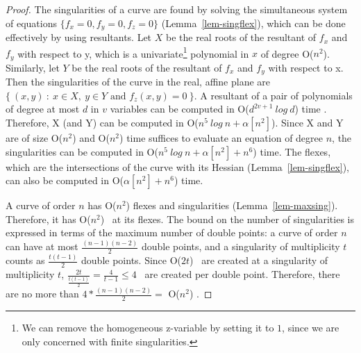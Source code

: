 \begin{proof}
The singularities of a curve are found by solving the simultaneous system
of equations
\mbox{$\{f_{x} = 0, f_{y}=0, f_{z} = 0\}$} (Lemma~\ref{lem-singflex}),
which can be done effectively by using resultants.
Let $X$ be the real roots of the resultant of $f_{x}$ and $f_{y}$ with 
respect to y,
which is a univariate\footnote{We can remove the
homogeneous z-variable by setting it to $1$, since we are only concerned
with finite singularities.}
polynomial in $x$ of degree O($n^{2}$).
Similarly, let $Y$ be the real roots of the resultant of $f_{x}$ and $f_{y}$ with 
respect to x.
Then the singularities of the curve in the real, affine plane are
\mbox{$\{\ (x,y)\ :\ x\in X,\ y \in Y \mbox{ and } f_{z}(x,y) = 0\ \}$.}
A resultant of a pair of polynomials of degree at most $d$ in $v$ variables 
can be computed in O($d^{2v+1}\ log\ d$) time \cite{col}.
Therefore, X (and Y) can be computed in O($n^{5}\ log\ n + \alpha[n^{2}]$).
Since X and Y are of size O($n^{2}$) and  
O($n^{2}$) time suffices 
to evaluate  an equation of degree $n$, the singularities
can be computed in O($n^{5}\ log\ n + \alpha[n^{2}] + n^{6}$) time.
The flexes, which are the intersections of the curve with its
Hessian (Lemma~\ref{lem-singflex}),
can also be computed in  O($\alpha[n^{2}] + n^{6}$) time.

A curve of order $n$ has O($n^{2}$) flexes and 
singularities (Lemma~\ref{lem-maxsing}).
Therefore, it has O($n^{2}$) \wallpoints\ at its flexes.
The bound on the number of singularities is expressed in terms
of the maximum number of double points: a curve of order $n$ can
have at most $\frac{(n-1)(n-2)}{2}$ double points, and
a singularity of multiplicity $t$ counts as $\frac{t(t-1)}{2}$ 
double points.
Since O($2t$) \pseudos\ are created at a singularity of multiplicity $t$,
$\frac{2t}{\frac{t(t-1)}{2}} = \frac{4}{t-1} \leq 4$ \pseudos\ are created
per double point.
Therefore, there are no more than $4*\frac{(n-1)(n-2)}{2} =$ O($n^{2}$) 
\pseudos.


\end{proof}
